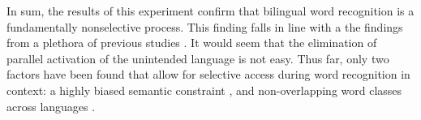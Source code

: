 

In sum, the results of this experiment confirm that bilingual word recognition is a fundamentally nonselective process. This finding falls in line with a the findings from a plethora of previous studies \parencite[e.g.,][]{Baten2010,Chambers2009,Dijkstra1998,Dijkstra1999,Duyck2007,Grainger1992,Gollan1997,Jared2001,Libben2009,Marian2003,Schwartz2006,Schwartz2007,VanAssche2009,VanAssche2010,VanHell2002,VanHell2008}. It would seem that the elimination of parallel activation of the unintended language is not easy. Thus far, only two factors have been found that allow for selective access during word recognition in context: a highly biased semantic constraint \parencite[e.g.,][]{Libben2009,Chambers2009,Schwartz2006,VanHell2008}, and non-overlapping word classes across languages \parencite[e.g.,][]{Baten2010,Sunderman2006}.




